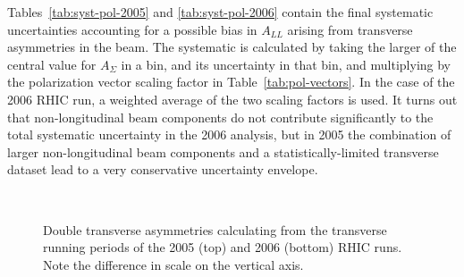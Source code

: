 Tables~\ref{tab:syst-pol-2005} and \ref{tab:syst-pol-2006} contain the final systematic uncertainties accounting for a possible bias in \(A_{LL}\) arising from transverse asymmetries in the beam.  The systematic is calculated by taking the larger of the central value for \(A_{\Sigma}\) in a bin, and its uncertainty in that bin, and multiplying by the polarization vector scaling factor in Table~\ref{tab:pol-vectors}.  In the case of the 2006 RHIC run, a weighted average of the two scaling factors is used.  It turns out that non-longitudinal beam components do not contribute significantly to the total systematic uncertainty in the 2006 analysis, but in 2005 the combination of larger non-longitudinal beam components and a statistically-limited transverse dataset lead to a very conservative uncertainty envelope.




\begin{figure}
   \\
  \caption{Double transverse asymmetries calculating from the transverse running periods of the 2005 (top) and 2006 (bottom) RHIC runs. Note the difference in scale on the vertical axis.}
  \label{fig:asigma}
\end{figure}

